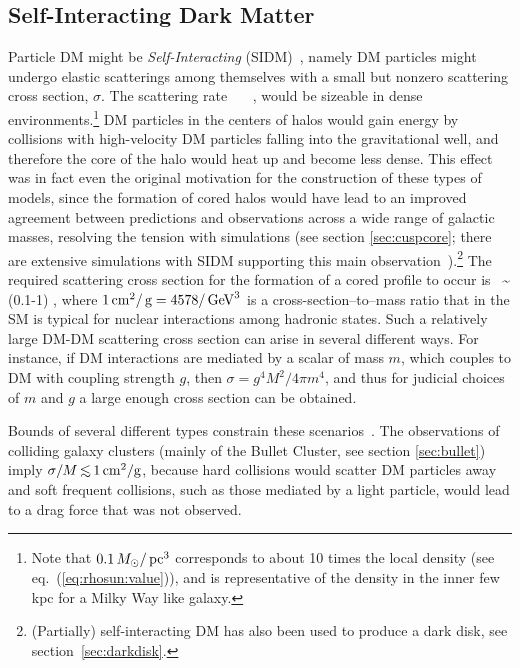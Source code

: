 \subsection{Self-Interacting Dark Matter}\label{sec:SIDM}
Particle DM might be {\em Self-Interacting} (SIDM)~\cite{SelfInteractingDM}, namely
DM particles might undergo elastic scatterings among themselves with a small but nonzero scattering cross section, $\sigma$.
The scattering rate 
\beq  {}  \approx {} \, \, \, ,
\eeq
would be sizeable in dense environments.\footnote{Note that $0.1 \, M_\odot/\,{\rm pc}^3$ corresponds to about 10 times the local density (see eq.~(\ref{eq:rhosun:value})), and is representative of the density in the inner few kpc for a Milky Way like galaxy.}  
DM particles in the centers of halos would gain energy by collisions with high-velocity DM particles falling into the
gravitational well, and therefore the core of the halo would heat up and become less dense. 
This effect was in fact even the original motivation for the construction of these types of models, since the formation of cored halos would have lead to an improved agreement between predictions and  observations across a wide range of galactic masses, resolving the tension with simulations (see section \ref{sec:cuspcore}; there are extensive simulations with SIDM supporting this main observation~\cite{Sims_alt_DM}).\footnote{(Partially) self-interacting DM has also been used to produce a dark disk, see section~\ref{sec:darkdisk}.}
The required scattering cross section for the formation of a cored profile to occur is~\cite{SelfInteractingDM}
\beq  {} \sim (0.1-1) ,
\eeq
where $1 \,{\rm cm}^2/\,{\rm g} = 4578/\,{\rm GeV}^3$ is a cross-section--to--mass ratio that in the SM is typical for nuclear interactions among hadronic states. 
Such a relatively large DM-DM scattering cross section can arise in several different ways. For instance, if DM interactions are mediated by a scalar of mass $m$, which couples to DM with coupling strength $g$, then $\sigma = g^4 M^2/4\pi m^4$, and thus for judicial choices of $m$ and $g$ a large enough cross section can be obtained.

\medskip

Bounds of several different types constrain these scenarios~\cite{SIDMotherbounds}. The observations of colliding galaxy clusters (mainly of the Bullet Cluster, see section \ref{sec:bullet}) imply $\sigma/M \circa{<} 1\cm^2/{\rm g}$,  
because hard collisions would scatter DM particles away~\cite{bulletcluster,selfinteractionlimits} and
soft frequent collisions, such as those mediated by a light particle,
would lead to a drag force that was not observed. 

